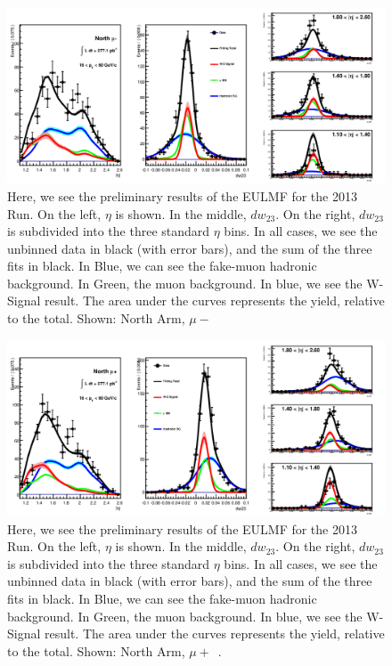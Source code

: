 \begin{figure}
  \centering
  \includegraphics[width=\linewidth]{./figures/prelim_full_maxlikefit_a1q0.jpg}
  \caption{
    Here, we see the preliminary results of the EULMF for the 2013 Run. On the
    left, $\eta$ is shown. In the middle, $dw_{23}$. On the right, $dw_{23}$ is
    subdivided into the three standard $\eta$ bins. In all cases, we see the
    unbinned data in black (with error bars), and the sum of the three fits in
    black. In Blue, we can see the fake-muon hadronic background. In Green, the
    muon background. In blue, we see the W-Signal result. The area under the
    curves represents the yield, relative to the total.  Shown: North Arm,
    $\mu-$~\cite{Seidl2014a}
  }
  \label{fig:maxlikefit_a1q0}
\end{figure}

\begin{figure}
  \centering
  \includegraphics[width=\linewidth]{./figures/prelim_full_maxlikefit_a1q1.jpg}
  \caption{
    Here, we see the preliminary results of the EULMF for the 2013 Run. On the
    left, $\eta$ is shown. In the middle, $dw_{23}$. On the right, $dw_{23}$ is
    subdivided into the three standard $\eta$ bins. In all cases, we see the
    unbinned data in black (with error bars), and the sum of the three fits in
    black. In Blue, we can see the fake-muon hadronic background. In Green, the
    muon background. In blue, we see the W-Signal result. The area under the
    curves represents the yield, relative to the total. Shown: North Arm,
    $\mu+$~\cite{Seidl2014a}.
  }
  \label{fig:maxlikefit_a1q1}
\end{figure}

